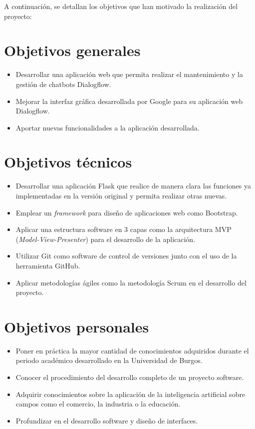 
A continuación, se detallan los objetivos que han motivado la realización del proyecto:

\section{Objetivos generales}\label{objetivos-generales}
    \begin{itemize}
		\tightlist		
		\item
		      Desarrollar una aplicación web que permita realizar el mantenimiento y la gestión de chatbots Dialogflow.
		\item
			Mejorar la interfaz gráfica desarrollada por Google para su aplicación web Dialogflow.
		\item
			Aportar nuevas funcionalidades a la aplicación desarrollada.			
	\end{itemize}

\section{Objetivos técnicos}\label{objetivos-tecnicos}
        \begin{itemize}
		\tightlist		
		\item
			Desarrollar una aplicación Flask que realice de manera clara las funciones ya implementadas en la versión original y permita realizar otras nuevas.
            \item 
                Emplear un \textit{framework} para diseño de aplicaciones web como Bootstrap.
            \item 
                Aplicar una estructura software en 3 capas como la arquitectura MVP (\textit{Model-View-Presenter}) para el desarrollo de la aplicación.
		\item
			Utilizar Git como software de control de versiones junto con el uso de la herramienta GitHub.
            \item 
                Aplicar metodologías ágiles como la metodología Scrum en el desarrollo del proyecto.
	\end{itemize}

\section{Objetivos personales}\label{objetivos-personales}
        \begin{itemize}
            \item 
                Poner en práctica la mayor cantidad de conocimientos adquiridos durante el periodo académico desarrollado en la Universidad de Burgos.
            \item 
                Conocer el procedimiento del desarrollo completo de un proyecto software.
            \item 
                Adquirir conocimientos sobre la aplicación de la inteligencia artificial sobre campos como el comercio, la industria o la educación.
            \item 
                Profundizar en el desarrollo software y diseño de interfaces.
        \end{itemize}